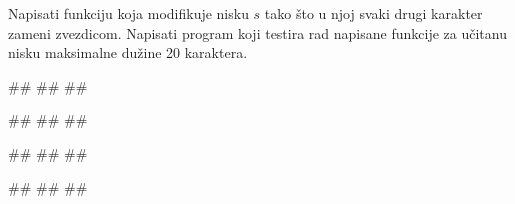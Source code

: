 \begin{Exercise}[label=p2.3_07] 
 Napisati funkciju  koja modifikuje nisku $s$ tako što u njoj svaki drugi karakter zameni zvezdicom. 
Napisati program koji testira rad napisane funkcije za učitanu nisku maksimalne dužine 20 karaktera. 
 
\begin{miditest}
\begin{upotreba}{1}
#\naslovInt#
##
##
\end{upotreba}
\end{miditest}
\begin{miditest}
\begin{upotreba}{2}
#\naslovInt#
##
##
\end{upotreba}
\end{miditest}

\begin{miditest}
\begin{upotreba}{3}
#\naslovInt#
##
##
\end{upotreba}
\end{miditest}
\begin{miditest}
\begin{upotreba}{4}
#\naslovInt#
##
##
\end{upotreba}
\end{miditest}

\end{Exercise}
\begin{Answer}[ref=p2.3_07]
\end{Answer}

